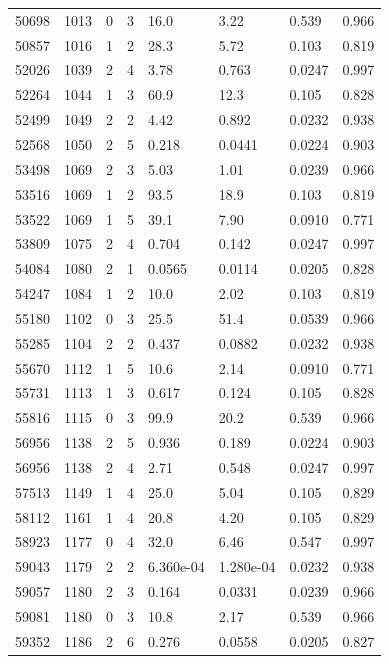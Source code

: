 \documentclass[preview]{standalone}
\begin{document}
{{{{{{\begin{tabular}{L{1.2cm}C{1.2cm} C{0.3cm}C{0.5cm} C{1.4cm}C{1.4cm} C{1.4cm}C{1.4cm}}
  50698  &  1013  & 0     &  3 &  16.0  & 3.22  & 0.539 &  0.966   \\ 
  50857  &  1016  & 1     &  2 &  28.3  & 5.72  & 0.103 &  0.819   \\ 
  52026  &  1039  & 2     &  4 &  3.78  & 0.763  & 0.0247 &  0.997   \\ 
  52264  &  1044  & 1     &  3 &  60.9  & 12.3  & 0.105 &  0.828   \\ 
  52499  &  1049  & 2     &  2 &  4.42  & 0.892  & 0.0232 &  0.938   \\ 
  52568  &  1050  & 2     &  5 &  0.218  & 0.0441  & 0.0224 &  0.903   \\ 
  53498  &  1069  & 2     &  3 &  5.03  & 1.01  & 0.0239 &  0.966   \\ 
  53516  &  1069  & 1     &  2 &  93.5  & 18.9  & 0.103 &  0.819   \\ 
  53522  &  1069  & 1     &  5 &  39.1  & 7.90  & 0.0910 &  0.771   \\ 
  53809  &  1075  & 2     &  4 &  0.704  & 0.142  & 0.0247 &  0.997   \\ 
  54084  &  1080  & 2     &  1 &  0.0565  & 0.0114  & 0.0205 &  0.828   \\ 
  54247  &  1084  & 1     &  2 &  10.0  & 2.02  & 0.103 &  0.819   \\ 
  55180  &  1102  & 0     &  3 &  25.5  & 51.4  & 0.0539 &  0.966   \\ 
  55285  &  1104  & 2     &  2 &  0.437  & 0.0882  & 0.0232 &  0.938   \\ 
  55670  &  1112  & 1     &  5 &  10.6  & 2.14  & 0.0910 &  0.771   \\ 
  55731  &  1113  & 1     &  3 &  0.617  & 0.124  & 0.105 &  0.828   \\ 
  55816  &  1115  & 0     &  3 &  99.9  & 20.2  & 0.539 &  0.966   \\ 
  56956  &  1138  & 2     &  5 &  0.936  & 0.189  & 0.0224 &  0.903   \\ 
  56956  &  1138  & 2     &  4 &  2.71  & 0.548  & 0.0247 &  0.997   \\ 
  57513  &  1149  & 1     &  4 &  25.0  & 5.04  & 0.105 &  0.829   \\ 
  58112  &  1161  & 1     &  4 &  20.8  & 4.20  & 0.105 &  0.829   \\ 
  58923  &  1177  & 0     &  4 &  32.0  & 6.46  & 0.547 &  0.997   \\ 
  59043  &  1179  & 2     &  2 &  6.360e-04  & 1.280e-04  & 0.0232 &  0.938   \\ 
  59057  &  1180  & 2     &  3 &  0.164  & 0.0331  & 0.0239 &  0.966   \\ 
  59081  &  1180  & 0     &  3 &  10.8  & 2.17  & 0.539 &  0.966   \\ 
  59352  &  1186  & 2     &  6 &  0.276  & 0.0558  & 0.0205 &  0.827   \\ 
\hline 
\end{tabular} 

}}}}}}
\end{document}
